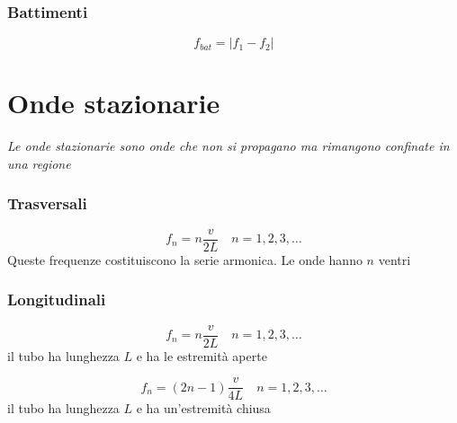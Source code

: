\documentclass{article}
\begin{document}
\subsubsection*{Battimenti}
$$ f_{bat} = |f_1 - f_2| $$

\section*{Onde stazionarie}
\textit{Le onde stazionarie sono onde che non si propagano ma rimangono confinate in una regione}

\subsubsection*{Trasversali}
$$ f_n = n \frac{v}{2L} \hspace{1em} n = 1,2,3,\dots $$
Queste frequenze costituiscono la serie armonica. Le onde hanno $n$ ventri

\subsubsection*{Longitudinali}
$$ f_n = n \frac{v}{2L} \hspace{1em} n = 1,2,3,\dots $$
il tubo ha lunghezza $L$ e ha le estremità aperte

\vspace{1em}
$$ f_n = (2n-1) \frac{v}{4L} \hspace{1em} n = 1,2,3,\dots $$
il tubo ha lunghezza $L$ e ha un'estremità chiusa
\end{document}
